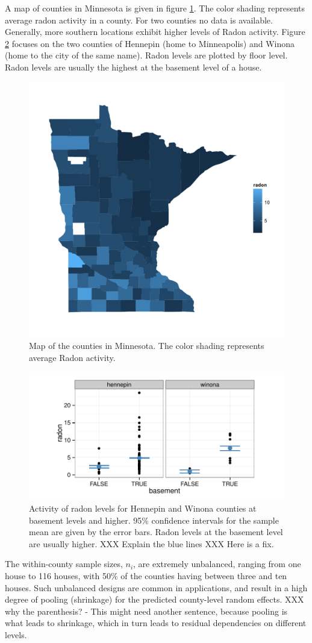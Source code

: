 \documentclass{article} %
\newcommand{\hh}[1]{{\color{orange} #1}}
\newcommand{\al}[1]{{\color{red} #1}}
\begin{document}
A map of counties in Minnesota is given in figure \ref{fig:map}. The color shading represents average radon activity in a county. For two counties no data is available. Generally, more southern locations exhibit higher  levels of Radon activity. Figure \ref{fig:tc} focuses on the two counties of Hennepin (home to Minneapolis) and Winona (home to the city of the same name). Radon levels are plotted by floor level. Radon levels are usually the highest at the basement level of a house. 
%
\begin{figure}[htb]
\centering
\includegraphics[width=0.5\linewidth]{figures/map.pdf}
\caption{\label{fig:map} Map of the counties in Minnesota. The color shading represents average Radon activity.}
\end{figure}
%
\begin{figure}[htb]
\centering
\includegraphics[width=0.7\linewidth]{figures/radon-twocounties.pdf}
\caption{\label{fig:tc} Activity of radon levels for Hennepin and Winona counties at basement levels and higher. 95\% confidence intervals for the sample mean are given by the error bars. Radon levels at the basement level are usually higher. \hh{XXX Explain the blue lines} \al{XXX Here is a fix.}}
\end{figure}
%
The within-county sample sizes, $n_i$, are extremely unbalanced, ranging from one house to 116 houses, with 50\% of the counties having between three and ten houses. Such unbalanced designs are common in applications, and result in a high degree of pooling \al{(shrinkage)} for the predicted county-level random effects. \hh{XXX why the parenthesis? - This might need another sentence, because pooling is what leads to shrinkage, which in turn leads to residual dependencies on different levels.}
\end{document}
